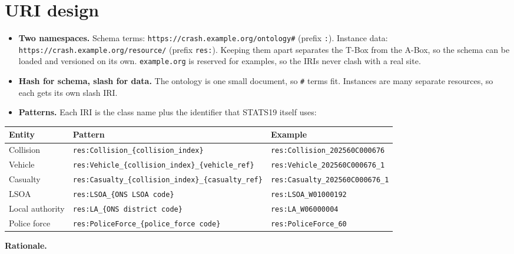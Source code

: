 \documentclass[10.5pt,a4paper]{article}
\begin{document}
\section{URI design}
\begin{itemize}[nosep]
\item \textbf{Two namespaces.} Schema terms: \texttt{https://crash.example.org/ontology\#} (prefix \texttt{:}). Instance data: \texttt{https://crash.example.org/resource/} (prefix \texttt{res:}). Keeping them apart separates the T-Box from the A-Box, so the schema can be loaded and versioned on its own. \texttt{example.org} is reserved for examples, so the IRIs never clash with a real site.
\item \textbf{Hash for schema, slash for data.} The ontology is one small document, so \texttt{\#} terms fit. Instances are many separate resources, so each gets its own slash IRI.
\item \textbf{Patterns.} Each IRI is the class name plus the identifier that STATS19 itself uses:
\end{itemize}
\begin{center}\small
\begin{tabular}{L{2.4cm} L{7.6cm} L{6.0cm}}
\toprule \textbf{Entity} & \textbf{Pattern} & \textbf{Example}\\\midrule
Collision & \texttt{res:Collision\_\{collision\_index\}} & \texttt{res:Collision\_202560C000676}\\
Vehicle & \texttt{res:Vehicle\_\{collision\_index\}\_\{vehicle\_ref\}} & \texttt{res:Vehicle\_202560C000676\_1}\\
Casualty & \texttt{res:Casualty\_\{collision\_index\}\_\{casualty\_ref\}} & \texttt{res:Casualty\_202560C000676\_1}\\
LSOA & \texttt{res:LSOA\_\{ONS LSOA code\}} & \texttt{res:LSOA\_W01000192}\\
Local authority & \texttt{res:LA\_\{ONS district code\}} & \texttt{res:LA\_W06000004}\\
Police force & \texttt{res:PoliceForce\_\{police\_force code\}} & \texttt{res:PoliceForce\_60}\\
\bottomrule
\end{tabular}\end{center}
\textbf{Rationale.}
\end{document}
